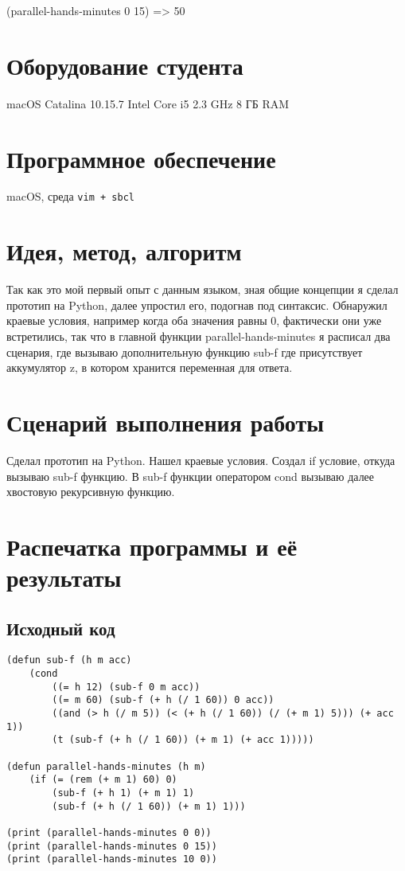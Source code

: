 \documentclass[15pt]{extarticle}
\begin{document}
(parallel-hands-minutes 0 15) => 50

\section{Оборудование студента}
macOS Catalina 10.15.7 Intel Core i5 2.3 GHz 8 ГБ RAM

\section{Программное обеспечение}
macOS, среда {\tt vim + sbcl}

\section{Идея, метод, алгоритм}
Так как это мой первый опыт с данным языком, зная общие концепции я сделал прототип на Python, далее упростил его, подогнав под синтаксис. Обнаружил краевые условия, например когда оба значения равны 0, фактически они уже встретились, так что в главной функции parallel-hands-minutes я расписал два сценария, где вызываю дополнительную функцию sub-f где присутствует аккумулятор z, в котором хранится переменная для ответа.

\section{Сценарий выполнения работы}
Сделал прототип на Python. Нашел краевые условия. Создал if условие, откуда вызываю sub-f функцию. В sub-f функции оператором cond вызываю далее хвостовую рекурсивную функцию.

\section{Распечатка программы и её результаты}

\subsection{Исходный код}

\begin{lstlisting}
(defun sub-f (h m acc)
    (cond
        ((= h 12) (sub-f 0 m acc))
        ((= m 60) (sub-f (+ h (/ 1 60)) 0 acc))
        ((and (> h (/ m 5)) (< (+ h (/ 1 60)) (/ (+ m 1) 5))) (+ acc 1)) 
        (t (sub-f (+ h (/ 1 60)) (+ m 1) (+ acc 1)))))

(defun parallel-hands-minutes (h m)  
    (if (= (rem (+ m 1) 60) 0)  
        (sub-f (+ h 1) (+ m 1) 1)  
        (sub-f (+ h (/ 1 60)) (+ m 1) 1)))

(print (parallel-hands-minutes 0 0)) 
(print (parallel-hands-minutes 0 15))
(print (parallel-hands-minutes 10 0)) 
\end{lstlisting}
\end{document}
